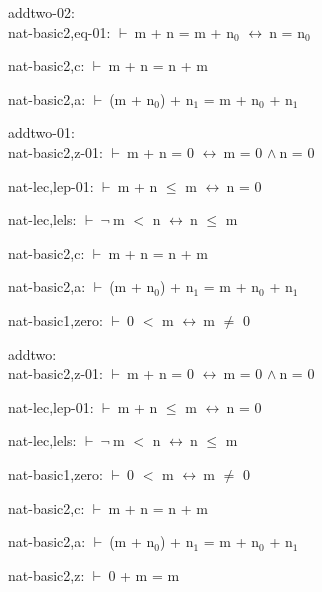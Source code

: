 \documentclass[a4paper]{article}
\newcommand{\Fol}{\mbox{$\vdash\ $}}
\newcommand{\Not}{\mbox{$\neg\ $}}
\newcommand{\And}{\mbox{$\wedge\ $}}
\newcommand{\Equiv}{\mbox{$\leftrightarrow\ $}}
\begin{document}
\bigskip

addtwo-02:\\ nat-basic2,eq-01: 
 \Fol m + n = m + $\mbox{n}_{0}$ \Equiv n = $\mbox{n}_{0}$



nat-basic2,c: 
 \Fol m + n = n + m



nat-basic2,a: 
 \Fol (m + $\mbox{n}_{0}$) + $\mbox{n}_{1}$ = m + $\mbox{n}_{0}$ + $\mbox{n}_{1}$



\bigskip

addtwo-01:\\ nat-basic2,z-01: 
 \Fol m + n = 0 \Equiv m = 0 \And n = 0



nat-lec,lep-01: 
 \Fol m + n $\le$ m \Equiv n = 0



nat-lec,lels: 
 \Fol \Not m $<$ n \Equiv n $\le$ m



nat-basic2,c: 
 \Fol m + n = n + m



nat-basic2,a: 
 \Fol (m + $\mbox{n}_{0}$) + $\mbox{n}_{1}$ = m + $\mbox{n}_{0}$ + $\mbox{n}_{1}$



nat-basic1,zero: 
 \Fol 0 $<$ m \Equiv m $\neq$ 0



\bigskip

addtwo:\\ nat-basic2,z-01: 
 \Fol m + n = 0 \Equiv m = 0 \And n = 0



nat-lec,lep-01: 
 \Fol m + n $\le$ m \Equiv n = 0



nat-lec,lels: 
 \Fol \Not m $<$ n \Equiv n $\le$ m



nat-basic1,zero: 
 \Fol 0 $<$ m \Equiv m $\neq$ 0



nat-basic2,c: 
 \Fol m + n = n + m



nat-basic2,a: 
 \Fol (m + $\mbox{n}_{0}$) + $\mbox{n}_{1}$ = m + $\mbox{n}_{0}$ + $\mbox{n}_{1}$



nat-basic2,z: 
 \Fol 0 + m = m



\bigskip
\end{document}
